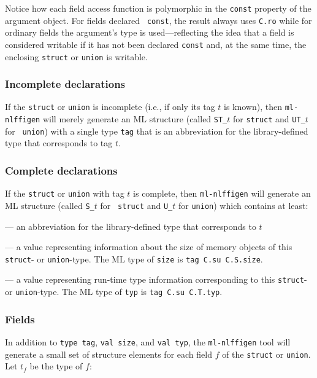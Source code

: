 \documentclass[titlepage,letterpaper]{article}
\newcommand{\gentool}{{\tt ml-nlffigen}}
\begin{document}
\noindent Notice how each field access function is polymorphic in the
{\tt const} property of the argument object.  For fields declared {\tt
  const}, the result always uses {\tt C.ro} while for ordinary fields
the argument's type is used---reflecting the idea that a field is
considered writable if it has not been declared {\tt const} and, at
the same time, the enclosing {\tt struct} or {\tt union} is writable.

\subsubsection*{Incomplete declarations}

If the {\tt struct} or {\tt union} is incomplete (i.e., if only its
tag $t$ is known), then {\gentool} will merely generate an ML structure
(called {\tt ST\_$t$} for {\tt struct} and {\tt UT\_$t$} for {\tt
  union}) with a single type {\tt tag} that is an abbreviation for the
library-defined type that corresponds to tag $t$.

\subsubsection*{Complete declarations}

If the {\tt struct} or {\tt union} with tag $t$ is complete, then
{\gentool} will generate an ML structure (called {\tt S\_$t$} for {\tt
  struct} and {\tt U\_$t$} for {\tt union}) which contains at least:
\begin{description}\setlength{\itemsep}{0pt}
\item[{\tt type tag}] --- an abbreviation for the library-defined type
  that corresponds to $t$
\item[{\tt val size}] --- a value representing information about the
  size of memory objects of this {\tt struct}- or {\tt union}-type.
  The ML type of {\tt size} is {\tt tag C.su C.S.size}.
\item[{\tt val typ}] --- a value representing run-time type
  information corresponding to this {\tt struct}- or {\tt union}-type.
  The ML type of {\tt typ} is {\tt tag C.su C.T.typ}.
\end{description}

\subsubsection*{Fields}

In addition to {\tt type tag}, {\tt val size}, and {\tt val typ}, the
{\gentool} tool will generate a small set of structure elements for
each field $f$ of the {\tt struct} or {\tt union}.  Let $t_f$ be the
type of $f$:
\end{document}
